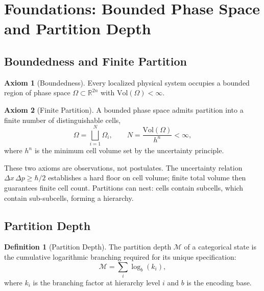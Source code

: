 \documentclass[11pt,twocolumn,a4paper]{article}
\theoremstyle{definition}
\newtheorem{definition}[theorem]{Definition}
\newtheorem{axiom}{Axiom}
\theoremstyle{remark}
\newcommand{\Depth}{\mathcal{M}}
\begin{document}
\section{Foundations: Bounded Phase Space and Partition Depth}
\label{sec:foundations}

\subsection{Boundedness and Finite Partition}

\begin{axiom}[Boundedness]
\label{ax:bounded}
Every localized physical system occupies a bounded region of phase space
$\Omega \subset \mathbb{R}^{2n}$ with $\mathrm{Vol}(\Omega) < \infty$.
\end{axiom}

\begin{axiom}[Finite Partition]
\label{ax:partition}
A bounded phase space admits partition into a finite number of distinguishable
cells,
\begin{equation}
    \Omega = \bigsqcup_{i=1}^{N} \Omega_i, \qquad
    N = \frac{\mathrm{Vol}(\Omega)}{h^n} < \infty,
\end{equation}
where $h^n$ is the minimum cell volume set by the uncertainty principle.
\end{axiom}

These two axioms are observations, not postulates.  The uncertainty relation
$\Delta x\,\Delta p \geq \hbar/2$ establishes a hard floor on cell volume;
finite total volume then guarantees finite cell count.  Partitions can nest:
cells contain subcells, which contain sub-subcells, forming a hierarchy.

\subsection{Partition Depth}

\begin{definition}[Partition Depth]
\label{def:depth}
The partition depth $\Depth$ of a categorical state is the cumulative
logarithmic branching required for its unique specification:
\begin{equation}
    \Depth = \sum_{i} \log_b(k_i),
    \label{eq:depth}
\end{equation}
where $k_i$ is the branching factor at hierarchy level $i$ and $b$ is the
encoding base.
\end{definition}
\end{document}
